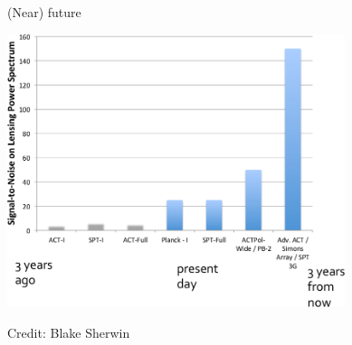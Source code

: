 \documentclass[table]{beamer}
\begin{document}
\begin{frame}{(Near) future}
	\begin{center}
		\includegraphics[height=8cm]{plots/cmb_lensing_past_future_blake.png}

		\vspace{-0.5cm}
		{\footnotesize Credit: Blake Sherwin}
	\end{center}
\end{frame}
\end{document}
